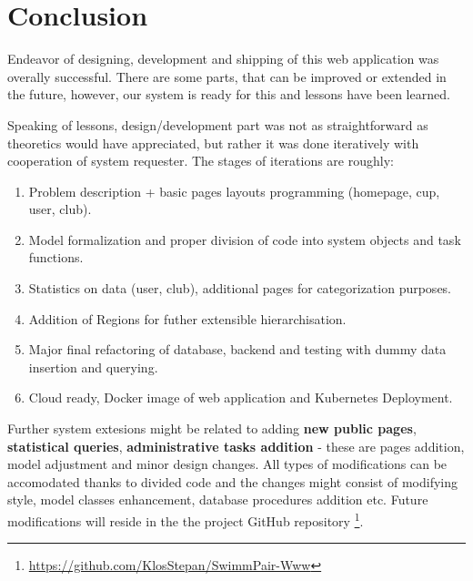 \chapter*{Conclusion}
Endeavor of designing, development and shipping of this web application was overally successful. There are some parts, that can be improved or extended in the future, however, our system is ready for this and lessons have been learned.
\par
Speaking of lessons, design/development part was not as straightforward as theoretics would have appreciated, but rather it was done iteratively with cooperation of system requester.  
\newline
The stages of iterations are roughly:  
\begin{enumerate}
    \item Problem description + basic pages layouts programming (homepage, cup, user, club).
  \item Model formalization and proper division of code into system objects and task functions.
  \item Statistics on data (user, club), additional pages for categorization purposes.
  \item Addition of Regions for futher extensible hierarchisation.
  \item Major final refactoring of database, backend and testing with dummy data insertion and querying.
  \item Cloud ready, Docker image of web application and Kubernetes Deployment.
\end{enumerate}
  Further system extesions might be related to adding \textbf{new public pages}, \textbf{statistical queries}, \textbf{administrative tasks addition} -  these are pages addition, model adjustment and minor design changes. All types of modifications can be accomodated thanks to divided code and the changes might consist of modifying style, model classes enhancement, database procedures addition etc. Future modifications will reside in the the project GitHub repository \footnote{\url{https://github.com/KlosStepan/SwimmPair-Www}}.
